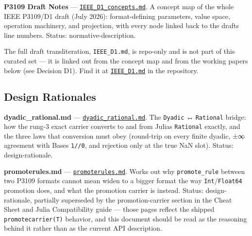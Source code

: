 \label{13265673906169446660}{}


\textbf{P3109 Draft Notes} — \href{https://github.com/JeffreySarnoff/SmallFloats.jl/blob/main/docs/other/IEEE_D1_concepts.md}{\texttt{IEEE\_\allowbreak{}D1\_\allowbreak{}concepts.md}}. A concept map of the whole IEEE P3109/D1 draft (July 2026): format-defining parameters, value space, operation machinery, and projection, with every node linked back to the draft{\textquotesingle}s line numbers. Status: normative-description.



The full draft transliteration, \texttt{IEEE\_\allowbreak{}D1.md}, is repo-only and is not part of this curated set — it is linked out from the concept map and from the working papers below (see Decision D1). Find it at \href{https://github.com/JeffreySarnoff/SmallFloats.jl/blob/main/docs/other/IEEE_D1.md}{\texttt{IEEE\_\allowbreak{}D1.md}} in the repository.



\subsection{Design Rationales}



\label{15541647678802253679}{}


\textbf{dyadic\_\allowbreak{}rational.md} — \href{https://github.com/JeffreySarnoff/SmallFloats.jl/blob/main/docs/other/dyadic_rational.md}{\texttt{dyadic\_\allowbreak{}rational.md}}. The \texttt{Dyadic} ↔ \texttt{Rational} bridge: how the rung-3 exact carrier converts to and from Julia{\textquotesingle}s \texttt{Rational} exactly, and the three laws that conversion must obey (round-trip on every finite dyadic, ±∞ agreement with Base{\textquotesingle}s \texttt{1//0}, and rejection only at the true NaN slot). Status: design-rationale.



\textbf{promoterules.md} — \href{https://github.com/JeffreySarnoff/SmallFloats.jl/blob/main/docs/other/promoterules.md}{\texttt{promoterules.md}}. Works out why \texttt{promote\_\allowbreak{}rule} between two P3109 formats cannot mean {\textquotedbl}widen to a bigger format{\textquotedbl} the way \texttt{Int}/\allowbreak\texttt{Float64} promotion does, and what the promotion carrier is instead. Status: design-rationale, partially superseded by the promotion-carrier section in the Cheat Sheet and Julia Compatibility guide — those pages reflect the shipped \texttt{promotecarrier(T)} behavior, and this document should be read as the reasoning behind it rather than as the current API description.




